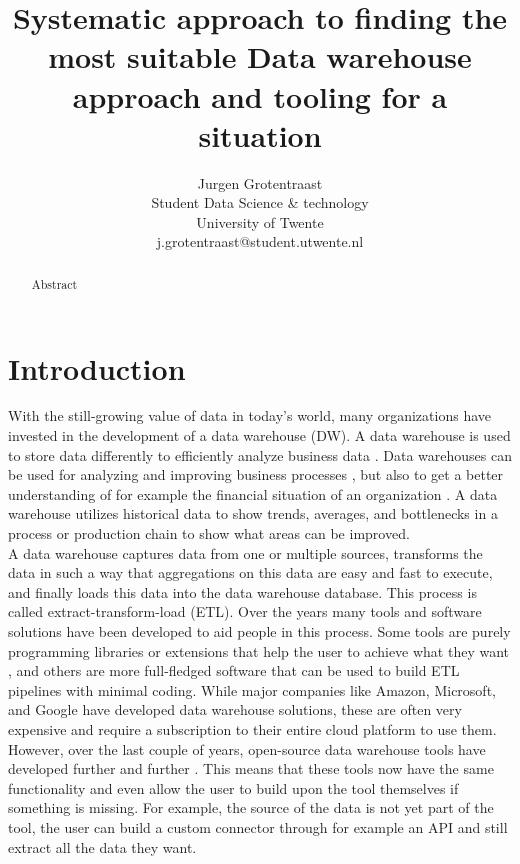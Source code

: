 \documentclass[11pt]{article}
\title{Systematic approach to finding the most suitable Data warehouse approach and tooling for a situation}
\author{Jurgen Grotentraast \\
  Student Data Science \& technology\\
  University of Twente \\
  j.grotentraast@student.utwente.nl\\}
\begin{document}
{\makeatletter\acl@finalcopytrue
  \maketitle
}
\begin{abstract}
Abstract
\end{abstract}

\section{Introduction}
With the still-growing value of data in today's world, many organizations have invested in the development of a data warehouse (DW). A data warehouse is used to store data differently to efficiently analyze business data \cite{gupta1997selection}. Data warehouses can be used for analyzing and improving business processes \cite{shahzad2009goal}, but also to get a better understanding of for example the financial situation of an organization \cite{lapura2018development}. A data warehouse utilizes historical data to show trends, averages, and bottlenecks in a process or production chain to show what areas can be improved. \\

A data warehouse captures data from one or multiple sources, transforms the data in such a way that aggregations on this data are easy and fast to execute, and finally loads this data into the data warehouse database. This process is called extract-transform-load (ETL). Over the years many tools and software solutions have been developed to aid people in this process. Some tools are purely programming libraries or extensions that help the user to achieve what they want \cite{Thomsen201821, Jensen202145, Biswas_programming2019267}, and others are more full-fledged software that can be used to build ETL pipelines with minimal coding. While major companies like Amazon, Microsoft, and Google have developed data warehouse solutions, these are often very expensive and require a subscription to their entire cloud platform to use them. However, over the last couple of years, open-source data warehouse tools have developed further and further \cite{nejres2015analysis}. This means that these tools now have the same functionality and even allow the user to build upon the tool themselves if something is missing. For example, the source of the data is not yet part of the tool, the user can build a custom connector through for example an API and still extract all the data they want. \\
\end{document}
